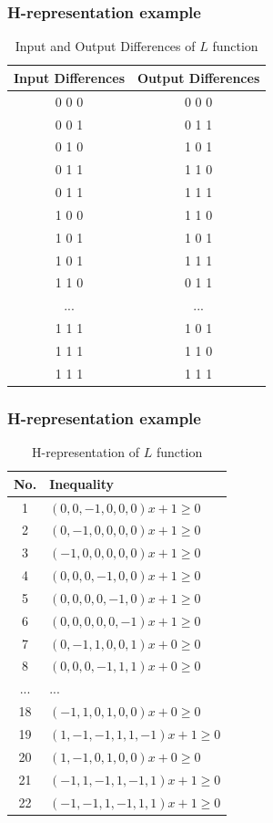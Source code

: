 \documentclass{beamer}
\begin{document}
\begin{frame}
    \frametitle{H-representation example}
\begin{table}[h]
\footnotesize
\centering
\begin{tabular}{|c|c|}
\hline
\textbf{Input Differences} & \textbf{Output Differences} \\ \hline
0 0 0 & 0 0 0 \\ \hline
0 0 1 & 0 1 1 \\ \hline
0 1 0 & 1 0 1 \\ \hline
0 1 1 & 1 1 0 \\ \hline
0 1 1 & 1 1 1 \\ \hline
1 0 0 & 1 1 0 \\ \hline
1 0 1 & 1 0 1 \\ \hline
1 0 1 & 1 1 1 \\ \hline
1 1 0 & 0 1 1 \\ \hline
... & ... \\ \hline
1 1 1 & 1 0 1 \\ \hline
1 1 1 & 1 1 0 \\ \hline
1 1 1 & 1 1 1 \\ \hline
\end{tabular}
\caption{Input and Output Differences of $L$ function}
\label{tab:hreptab}
\end{table}
    
\end{frame}
\begin{frame}
    \frametitle{H-representation example}
\begin{table}[h]
\footnotesize
\centering
\begin{tabular}{|c|l|}
\hline
\textbf{No.} & \textbf{Inequality} \\ \hline
1  & $(0, 0, -1, 0, 0, 0) x + 1 \geq 0$ \\ \hline
2  & $(0, -1, 0, 0, 0, 0) x + 1 \geq 0$ \\ \hline
3  & $(-1, 0, 0, 0, 0, 0) x + 1 \geq 0$ \\ \hline
4  & $(0, 0, 0, -1, 0, 0) x + 1 \geq 0$ \\ \hline
5  & $(0, 0, 0, 0, -1, 0) x + 1 \geq 0$ \\ \hline
6  & $(0, 0, 0, 0, 0, -1) x + 1 \geq 0$ \\ \hline
7  & $(0, -1, 1, 0, 0, 1) x + 0 \geq 0$ \\ \hline
8  & $(0, 0, 0, -1, 1, 1) x + 0 \geq 0$ \\ \hline
... & ... \\ \hline
18 & $(-1, 1, 0, 1, 0, 0) x + 0 \geq 0$ \\ \hline
19 & $(1, -1, -1, 1, 1, -1) x + 1 \geq 0$ \\ \hline
20 & $(1, -1, 0, 1, 0, 0) x + 0 \geq 0$ \\ \hline
21 & $(-1, 1, -1, 1, -1, 1) x + 1 \geq 0$ \\ \hline
22 & $(-1, -1, 1, -1, 1, 1) x + 1 \geq 0$ \\ \hline
\end{tabular}
\caption{H-representation of $L$ function}
\label{tab:h-repineq}
\end{table}
    
\end{frame}
\end{document}
